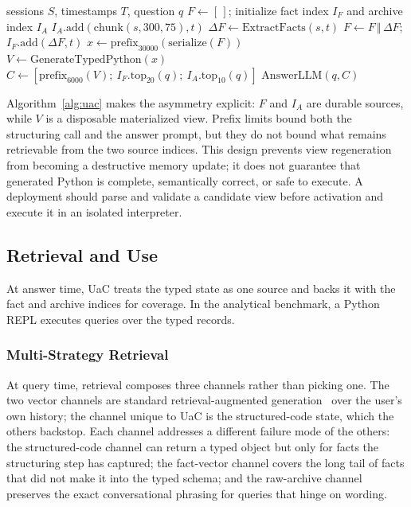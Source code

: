 \documentclass[letterpaper]{article} %
\begin{document}
\begin{algorithm}[t]
\caption{Evaluated UaC update and recall path.}
\label{alg:uac}
\begin{algorithmic}[1]
\REQUIRE sessions $S$, timestamps $T$, question $q$
\STATE $F \gets [\,]$; initialize fact index $I_F$ and archive index $I_A$
  \STATE $I_A.\mathrm{add}(\mathrm{chunk}(s,300,75),t)$
  \STATE $\Delta F \gets \mathrm{ExtractFacts}(s,t)$
  \STATE $F \gets F\,\Vert\,\Delta F$; $I_F.\mathrm{add}(\Delta F,t)$
\ENDFOR
\STATE $x \gets \mathrm{prefix}_{30000}(\mathrm{serialize}(F))$
\STATE $V \gets \mathrm{GenerateTypedPython}(x)$
\STATE $C \gets [\mathrm{prefix}_{6000}(V);\ I_F.\mathrm{top}_{20}(q);\ I_A.\mathrm{top}_{10}(q)]$
\RETURN $\mathrm{AnswerLLM}(q,C)$
\end{algorithmic}
\end{algorithm}

Algorithm~\ref{alg:uac} makes the asymmetry explicit: $F$ and $I_A$ are durable sources, while $V$ is a disposable materialized view. Prefix limits bound both the structuring call and the answer prompt, but they do not bound what remains retrievable from the two source indices. This design prevents view regeneration from becoming a destructive memory update; it does not guarantee that generated Python is complete, semantically correct, or safe to execute. A deployment should parse and validate a candidate view before activation and execute it in an isolated interpreter.

\subsection{Retrieval and Use}
\label{sec:retrieval-use}

At answer time, UaC treats the typed state as one source and backs it with the fact and archive indices for coverage. In the analytical benchmark, a Python REPL executes queries over the typed records.

\subsubsection{Multi-Strategy Retrieval}
\label{sec:retrieval}

At query time, retrieval composes three channels rather than picking one. The two vector channels are standard retrieval-augmented generation~\citep{lewis2020rag} over the user's own history; the channel unique to UaC is the structured-code state, which the others backstop. Each channel addresses a different failure mode of the others: the structured-code channel can return a typed object but only for facts the structuring step has captured; the fact-vector channel covers the long tail of facts that did not make it into the typed schema; and the raw-archive channel preserves the exact conversational phrasing for queries that hinge on wording.
\end{document}
